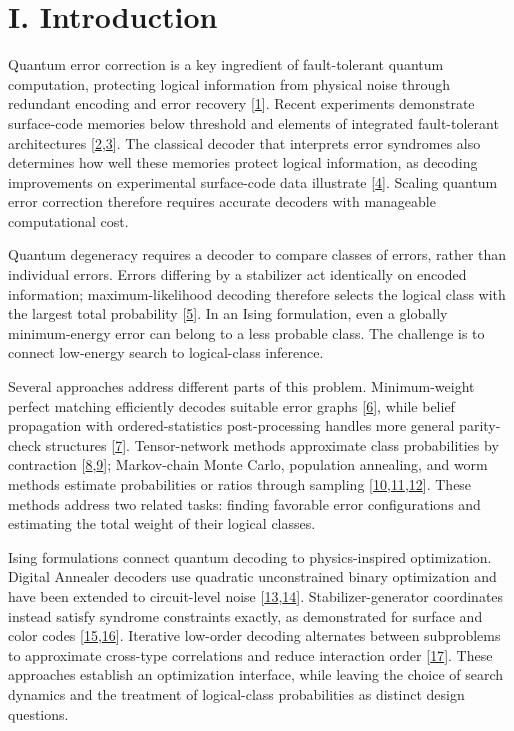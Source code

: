 \documentclass[
  10pt,
]{article}
\begin{document}
\section{I. Introduction}\label{i.-introduction}

Quantum error correction is a key ingredient of fault-tolerant quantum
computation, protecting logical information from physical noise through
redundant encoding and error recovery {[}\hyperlink{ref:1}{1}{]}. Recent experiments
demonstrate surface-code memories below threshold and elements of
integrated fault-tolerant architectures {[}\hyperlink{ref:2}{2},\hyperlink{ref:3}{3}{]}. The classical decoder
that interprets error syndromes also determines how well these memories
protect logical information, as decoding improvements on experimental
surface-code data illustrate {[}\hyperlink{ref:4}{4}{]}. Scaling quantum error correction
therefore requires accurate decoders with manageable computational cost.

Quantum degeneracy requires a decoder to compare classes of errors,
rather than individual errors. Errors differing by a stabilizer act
identically on encoded information; maximum-likelihood decoding
therefore selects the logical class with the largest total probability
{[}\hyperlink{ref:5}{5}{]}. In an Ising formulation, even a globally minimum-energy error
can belong to a less probable class. The challenge is to connect
low-energy search to logical-class inference.

Several approaches address different parts of this problem.
Minimum-weight perfect matching efficiently decodes suitable error
graphs {[}\hyperlink{ref:6}{6}{]}, while belief propagation with ordered-statistics
post-processing handles more general parity-check structures {[}\hyperlink{ref:7}{7}{]}.
Tensor-network methods approximate class probabilities by contraction
{[}\hyperlink{ref:8}{8},\hyperlink{ref:9}{9}{]}; Markov-chain Monte Carlo, population annealing, and worm
methods estimate probabilities or ratios through sampling
{[}\hyperlink{ref:10}{10},\hyperlink{ref:11}{11},\hyperlink{ref:12}{12}{]}. These methods address two related tasks: finding
favorable error configurations and estimating the total weight of their
logical classes.

Ising formulations connect quantum decoding to physics-inspired
optimization. Digital Annealer decoders use quadratic unconstrained
binary optimization and have been extended to circuit-level noise
{[}\hyperlink{ref:13}{13},\hyperlink{ref:14}{14}{]}. Stabilizer-generator coordinates instead satisfy syndrome
constraints exactly, as demonstrated for surface and color codes
{[}\hyperlink{ref:15}{15},\hyperlink{ref:16}{16}{]}. Iterative low-order decoding alternates between subproblems
to approximate cross-type correlations and reduce interaction order
{[}\hyperlink{ref:17}{17}{]}. These approaches establish an optimization interface, while
leaving the choice of search dynamics and the treatment of logical-class
probabilities as distinct design questions.
\end{document}
